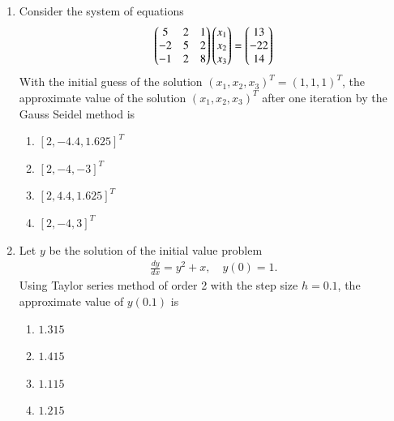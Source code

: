\documentclass[journal]{IEEEtran}
\numberwithin{equation}{enumi}
\numberwithin{figure}{enumi}
\begin{document}
\begin{enumerate}
\newpage

\item Consider the system of equations
\begin{align*}
\begin{pmatrix}
5 & 2 & 1 \\
-2 & 5 & 2 \\
-1 & 2 & 8
\end{pmatrix}
\begin{pmatrix}
x_1 \\ x_2 \\ x_3
\end{pmatrix}
=
\begin{pmatrix}
13 \\ -22 \\ 14
\end{pmatrix}
\end{align*}
With the initial guess of the solution $(x_1, x_2, x_3)^T = (1, 1, 1)^T$, the approximate value of the solution $(x_1, x_2, x_3)^T$ after one iteration by the Gauss Seidel method is

\hfill{}
\begin{multicols}{2}
\begin{enumerate}
    \item $[2, -4.4, 1.625]^T$
    \item $[2, -4, -3]^T$
    \item  $[2, 4.4, 1.625]^T$ 
    \item $[2, -4, 3]^T$

\end{enumerate}
\end{multicols}



\item Let $y$ be the solution of the initial value problem
\begin{align*}
\frac{dy}{dx} = y^2 + x, \quad y(0) = 1.
\end{align*}
Using Taylor series method of order 2 with the step size $h = 0.1$, the approximate value of $y(0.1)$ is
\hfill{}
\begin{multicols}{4}
\begin{enumerate}
    \item $1.315$ 
    \item $1.415$
    \item $1.115$
    \item $1.215$

\end{enumerate}
\end{multicols}



\end{enumerate}
\end{document}
